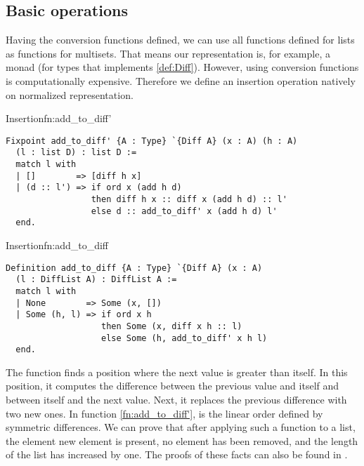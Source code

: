 \subsection{Basic operations}
Having the conversion functions defined, we can use all functions defined for lists as functions for multisets. That means our representation is, for example, a monad (for types that implements \ref{def:Diff}). However, using conversion functions is computationally expensive. Therefore we define an insertion operation natively on normalized representation.
\begin{func}{Insertion}{fn:add_to_diff'}
\begin{verbatim}
Fixpoint add_to_diff' {A : Type} `{Diff A} (x : A) (h : A) 
  (l : list D) : list D :=
  match l with
  | []        => [diff h x]
  | (d :: l') => if ord x (add h d)
                 then diff h x :: diff x (add h d) :: l'
                 else d :: add_to_diff' x (add h d) l'
  end.
\end{verbatim}
\end{func}
\begin{func}{Insertion}{fn:add_to_diff}
\begin{verbatim}
Definition add_to_diff {A : Type} `{Diff A} (x : A) 
  (l : DiffList A) : DiffList A :=
  match l with
  | None        => Some (x, [])
  | Some (h, l) => if ord x h
                   then Some (x, diff x h :: l)
                   else Some (h, add_to_diff' x h l)
  end.
\end{verbatim}
\end{func}
The function  finds a position where the next value is greater than itself. In this position, it computes the difference between the previous value and itself and between itself and the next value. Next, it replaces the previous difference with two new ones. In function \ref{fn:add_to_diff'},  is the linear order defined by symmetric differences. We can prove that after applying such a function to a list, the element new element is present, no element has been removed, and the length of the list has increased by one. The proofs of these facts can also be found in .
